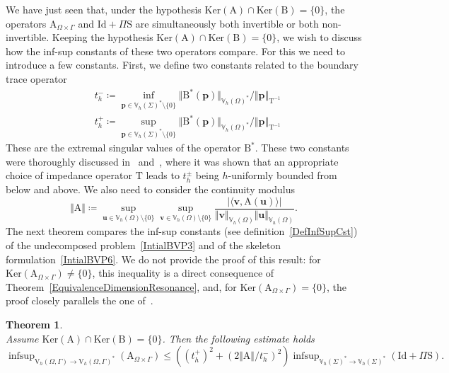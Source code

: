 \documentclass[a4paper,11pt]{article}
\newcommand{\mrm}{\mathrm}
\newcommand{\mA}{\mathrm{A}}
\newcommand{\mB}{\mathrm{B}}
\newcommand{\Id}{\mathrm{Id}}
\newcommand{\mT}{\mathrm{T}}
\newcommand{\mS}{\mathrm{S}}
\newcommand{\mbV}{\mathbb{V}}
\newcommand{\Vh}{\mathrm{V}_{h}}
\newcommand{\infsup}{\mathop{\mrm{infsup}}}
\newcommand{\bp}{\boldsymbol{p}}
\newcommand{\bu}{\boldsymbol{u}}
\newcommand{\bv}{\boldsymbol{v}}
\newtheorem{thm}[defn]{Theorem}
\begin{document}
We have just seen that, under the hypothesis
$\mrm{Ker}(\mA)\cap\mrm{Ker}(\mB) = \{0\}$, the operators
$\mA_{\Omega\times\Gamma}$ and $\mrm{Id}+\Pi\mS$ are simultaneously
both invertible or both non-invertible. Keeping the hypothesis
$\mrm{Ker}(\mA)\cap\mrm{Ker}(\mB) = \{0\}$, we wish to discuss how the
inf-sup constants of these two operators compare. For this we need to
introduce a few constants. First, we define two constants related
to the boundary trace operator
\begin{equation*}
  \begin{aligned}
    & t_{h}^{-}\coloneq \inf_{\bp\in\mbV_h(\Sigma)^*\setminus\{0\}} \Vert
    \mB^*(\bp)\Vert_{\mbV_h(\Omega)^{*}}/ \Vert
    \bp\Vert_{\mT^{-1}}\\
    & t_{h}^{+}\coloneq
    \sup_{\bp\in\mbV_h(\Sigma)^*\setminus\{0\}} \Vert
    \mB^*(\bp)\Vert_{\mbV_h(\Omega)^{*}}/ \Vert
    \bp\Vert_{\mT^{-1}}
  \end{aligned}
\end{equation*}
These are the extremal singular values of the operator $\mB^{*}$.
These two constants were thoroughly discussed in~\cite[Section
  7]{MR4648528} and~\cite{MR4433119}, where it was shown that an
appropriate choice of impedance operator $\mT$ leads to $t_h^{\pm}$
being $h$-uniformly bounded from below and above. We also need to
consider the continuity modulus
\begin{equation*}
  \Vert \mA\Vert\coloneq \sup_{\bu\in \mbV_h(\Omega)\setminus\{0\}}
  \sup_{\bv\in \mbV_h(\Omega)\setminus\{0\}} \frac{\vert\langle
    \bv,\mA(\bu)\rangle\vert}{\Vert
    \bv\Vert_{\mbV_h(\Omega)}\Vert
    \bu\Vert_{\mbV_h(\Omega)}}.
\end{equation*}
The next theorem compares the inf-sup constants (see definition~\eqref{DefInfSupCst}) of the
undecomposed problem~\eqref{IntialBVP3} and of the skeleton formulation~\eqref{IntialBVP6}. We do not provide the proof of this result: for
$\mrm{Ker}(\mA_{\Omega\times\Gamma})\neq \{0\}$, this inequality is a
direct consequence of Theorem~\ref{EquivalenceDimensionResonance}, and,
for $\mrm{Ker}(\mA_{\Omega\times\Gamma})= \{0\}$, the proof closely
parallels the one of~\cite[Propositions 8.1 and 8.4]{MR4648528}.

\begin{thm}\quad\\
  Assume $\mrm{Ker}(\mA)\cap\mrm{Ker}(\mB) = \{0\}$.
  Then the following estimate holds
  \begin{equation*}
    \infsup_{\Vh(\Omega,\Gamma)\to
      \Vh(\Omega,\Gamma)^*}(\mA_{\Omega\times\Gamma}) \leq (
    (t_h^+)^2+(2\Vert \mA\Vert/t_h^-)^2 )
    \infsup_{\mbV_h(\Sigma)^*\to
      \mbV_h(\Sigma)^*}(\Id+\Pi\mS).
  \end{equation*}
\end{thm}
\end{document}
